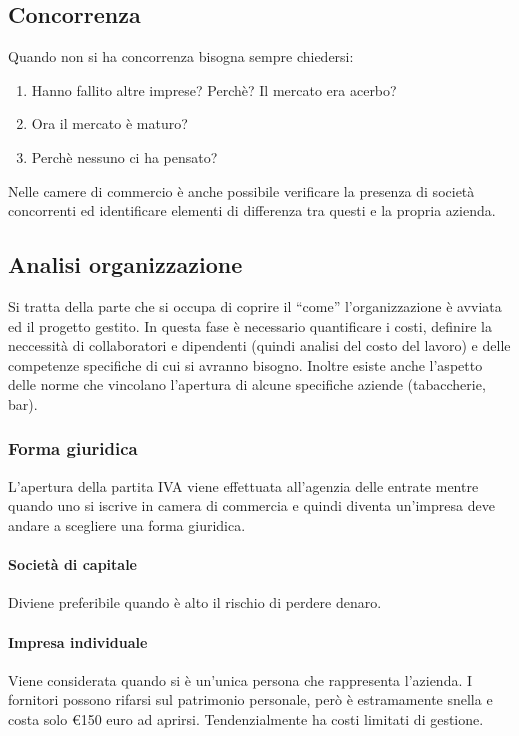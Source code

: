 \subsection{Concorrenza}
Quando non si ha concorrenza bisogna sempre chiedersi:

\begin{enumerate}
  \item Hanno fallito altre imprese? Perchè? Il mercato era acerbo?
  \item Ora il mercato è maturo?
  \item Perchè nessuno ci ha pensato?
\end{enumerate}

Nelle camere di commercio è anche possibile verificare la presenza di società concorrenti ed identificare elementi di differenza tra questi e la propria azienda.

\subsection{Analisi organizzazione}
Si tratta della parte che si occupa di coprire il ``come'' l'organizzazione è avviata ed il progetto gestito. In questa fase è necessario quantificare i costi, definire la neccessità di collaboratori e dipendenti (quindi analisi del costo del lavoro) e delle competenze specifiche di cui si avranno bisogno. Inoltre esiste anche l'aspetto delle norme che vincolano l'apertura di alcune specifiche aziende (tabaccherie, bar).

\subsubsection{Forma giuridica}
L'apertura della partita IVA viene effettuata all'agenzia delle entrate mentre quando uno si iscrive in camera di commercia e quindi diventa un'impresa deve andare a scegliere una forma giuridica.

\paragraph{Società di capitale}
Diviene preferibile quando è alto il rischio di perdere denaro.

\paragraph{Impresa individuale}
Viene considerata quando si è un'unica persona che rappresenta l'azienda. I fornitori possono rifarsi sul patrimonio personale, però è estramamente snella e costa solo €150 euro ad aprirsi. Tendenzialmente ha costi limitati di gestione.

